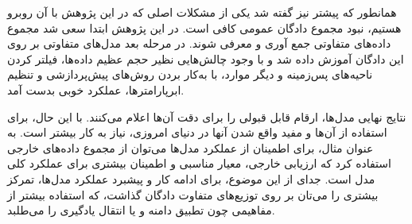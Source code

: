 
همانطور که پیشتر نیز گفته شد یکی از مشکلات اصلی که در این پژوهش با آن روبرو هستیم، نبود مجموع دادگان عمومی کافی است.
در این پژوهش ابتدا سعی شد مجموع داده‌های متفاوتی جمع آوری و معرفی شوند.
در مرحله بعد مدل‌های متفاوتی بر روی این دادگان آموزش داده شد و با وجود چالش‌هایی نظیر حجم عظیم داده‌ها، فیلتر کردن ناحیه‌های پس‌زمینه و دیگر موارد، با به‌کار بردن روش‌های پیش‌پردازشی و تنظیم ابرپارامتر‌ها، عملکرد خوبی بدست آمد.

نتایج نهایی مدل‌ها، ارقام قابل قبولی را برای دقت آن‌ها اعلام می‌کنند. با این حال، برای استفاده از آن‌ها و مفید واقع شدن آنها در دنیای امروزی، نیاز به کار بیشتر است. به عنوان مثال، برای اطمینان از عملکرد مدل‌ها می‌توان از مجموع داده‌های خارجی استفاده کرد که ارزیابی خارجی، معیار مناسبی و اطمینان بیشتری برای عملکرد کلی مدل است. جدای از این موضوع، برای ادامه کار و پیشبرد عملکرد مدل‌ها، تمرکز بیشتری را می‌‌تان بر روی توزیع‌های متفاوت دادگان گذاشت، که استفاده بیشتر از مفاهیمی چون تطبیق دامنه و یا انتقال یادگیری را می‌طلبد.